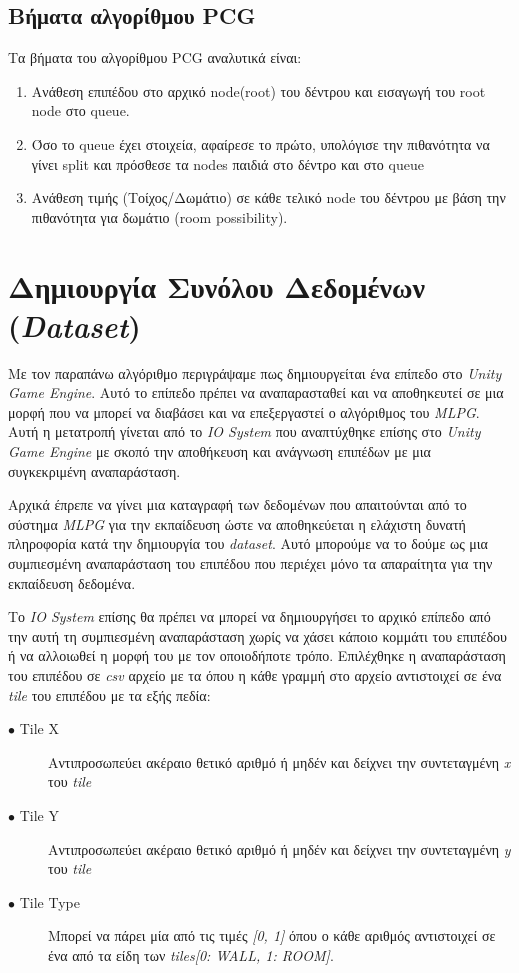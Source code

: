 \subsection{Βήματα αλγορίθμου PCG}
Τα βήματα του αλγορίθμου PCG αναλυτικά είναι:

\begin{enumerate}
	\item Ανάθεση επιπέδου στο αρχικό node(root) του δέντρου και εισαγωγή του root node στο queue.
	\item Όσο το queue έχει στοιχεία, αφαίρεσε το πρώτο, υπολόγισε την πιθανότητα να γίνει split και πρόσθεσε τα nodes παιδιά στο δέντρο και στο queue
	\item Ανάθεση τιμής (Τοίχος/Δωμάτιο) σε κάθε τελικό node του δέντρου με βάση την πιθανότητα για δωμάτιο (room possibility).
\end{enumerate}

\section{Δημιουργία Συνόλου Δεδομένων (\textit{Dataset})}
Με τον παραπάνω αλγόριθμο περιγράψαμε πως δημιουργείται ένα επίπεδο στο \textit{Unity Game Engine}. Αυτό το επίπεδο πρέπει να αναπαρασταθεί και να αποθηκευτεί σε μια μορφή που να μπορεί να διαβάσει και να επεξεργαστεί ο αλγόριθμος του \textit{MLPG}. Αυτή η μετατροπή γίνεται από το \textit{IO System} που αναπτύχθηκε επίσης στο \textit{Unity Game Engine} με σκοπό την αποθήκευση και ανάγνωση επιπέδων με μια συγκεκριμένη αναπαράσταση.
\par
Αρχικά έπρεπε να γίνει μια καταγραφή των δεδομένων που απαιτούνται από το σύστημα \textit{MLPG} για την εκπαίδευση ώστε να αποθηκεύεται η ελάχιστη δυνατή πληροφορία κατά την δημιουργία του \textit{dataset}. Αυτό μπορούμε να το δούμε ως μια συμπιεσμένη αναπαράσταση του επιπέδου που περιέχει μόνο τα απαραίτητα για την εκπαίδευση δεδομένα.
\par
Το \textit{IO System} επίσης θα πρέπει να μπορεί να δημιουργήσει το αρχικό επίπεδο από την αυτή τη συμπιεσμένη αναπαράσταση χωρίς να χάσει κάποιο κομμάτι του επιπέδου ή να αλλοιωθεί η μορφή του με τον οποιοδήποτε τρόπο. Επιλέχθηκε η αναπαράσταση του επιπέδου σε \textit{csv} αρχείο με τα όπου η κάθε γραμμή στο αρχείο αντιστοιχεί σε ένα \textit{tile} του επιπέδου με τα εξής πεδία:

\begin{description}
\item[$\bullet$ Tile X] Αντιπροσωπεύει ακέραιο θετικό αριθμό ή μηδέν και δείχνει την συντεταγμένη \textit{x} του \textit{tile}
\item[$\bullet$ Tile Y] Αντιπροσωπεύει ακέραιο θετικό αριθμό ή μηδέν και δείχνει την συντεταγμένη \textit{y} του \textit{tile}
\item[$\bullet$ Tile Type] Μπορεί να πάρει μία από τις τιμές \textit{[0, 1]} όπου ο κάθε αριθμός αντιστοιχεί σε ένα από τα είδη των \textit{tiles}\textit{[0: WALL, 1: ROOM]}.
\end{description}

